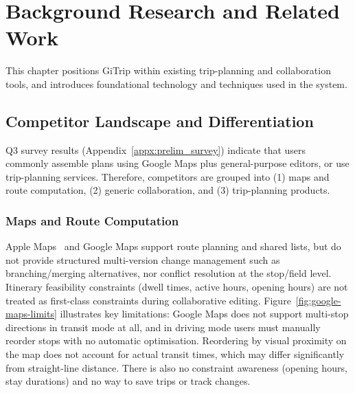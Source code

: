 \chapter{Background Research and Related Work}
\label{ch:background}

This chapter positions GiTrip within existing trip-planning and collaboration
tools, and introduces foundational technology and techniques used in the system.

\section{Competitor Landscape and Differentiation}
\label{sec:competitors}

Q3 survey results (Appendix~\ref{appx:prelim_survey}) indicate that users
commonly assemble plans using Google Maps plus general-purpose editors, or use
trip-planning services. Therefore, competitors are grouped into (1) maps and
route computation, (2) generic collaboration, and (3) trip-planning products.

\subsection{Maps and Route Computation}
Apple Maps~\cite{ref_apple_maps} and Google Maps support
route planning and shared lists, but do not provide structured multi-version
change management such as branching/merging alternatives, nor conflict
resolution at the stop/field level. Itinerary feasibility constraints (dwell
times, active hours, opening hours) are not treated as first-class constraints
during collaborative editing. Figure~\ref{fig:google-maps-limits} illustrates key limitations: Google Maps
does not support multi-stop directions in transit mode at all, and in driving
mode users must manually reorder stops with no automatic optimisation. Reordering
by visual proximity on the map does not account for actual transit times, which
may differ significantly from straight-line distance. There is also no constraint
awareness (opening hours, stay durations) and no way to save trips or track
changes.

